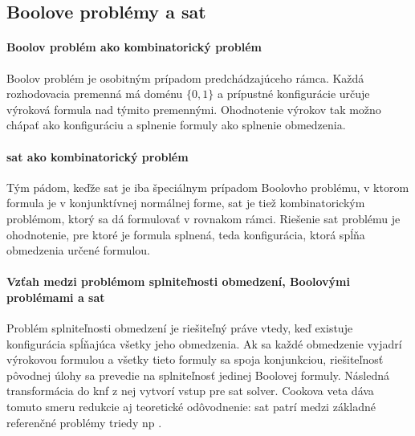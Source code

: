\subsection{Boolove problémy a \acrshort{sat}}\label{sec:combinatorics:boolean-problems-sat}

\paragraph{Boolov problém ako kombinatorický problém}
Boolov problém je osobitným prípadom predchádzajúceho rámca. Každá rozhodovacia premenná má doménu $\{0,1\}$ a prípustné konfigurácie určuje výroková formula nad týmito premennými. Ohodnotenie výrokov tak možno chápať ako konfiguráciu a splnenie formuly ako splnenie obmedzenia.

\paragraph{\Acrshort{sat} ako kombinatorický problém}
Tým pádom, keďže \acrshort{sat} je iba špeciálnym prípadom Boolovho
problému, v ktorom formula je v konjunktívnej normálnej forme, \acrshort{sat}
je tiež kombinatorickým problémom, ktorý sa dá formulovať v rovnakom rámci.
Riešenie \acrshort{sat} problému je ohodnotenie, pre ktoré je formula splnená,
teda konfigurácia, ktorá spĺňa obmedzenia určené formulou.

\paragraph{Vzťah medzi problémom splniteľnosti obmedzení, Boolovými problémami a \acrshort{sat}}
Problém splniteľnosti obmedzení je riešiteľný práve vtedy, keď existuje konfigurácia spĺňajúca všetky jeho obmedzenia. Ak sa každé obmedzenie vyjadrí výrokovou formulou a všetky tieto formuly sa spoja konjunkciou, riešiteľnosť pôvodnej úlohy sa prevedie na splniteľnosť jedinej Boolovej formuly. Následná transformácia do \acrshort{knf} z nej vytvorí vstup pre \acrshort{sat} solver. Cookova veta dáva tomuto smeru redukcie aj teoretické odôvodnenie: \acrshort{sat} patrí medzi základné referenčné problémy triedy \acrshort{np} \cite{Cook1971}.

